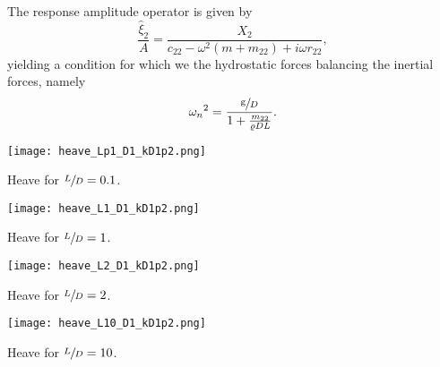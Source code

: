 The response amplitude operator is given by
\[
    \frac{\hat{\xi}_2}{A} = \frac{X_2}{c_{22} - \omega^2 (m + m_{22}) + i \omega r_{22}},
\]
yielding a condition for which we the hydrostatic forces balancing the inertial forces, namely
\[
    {\omega_n}^2 = \frac{\sfrac{\mathrm{g}}{D}}{1 + \frac{m_{22}}{\varrho D L}}.
\]
\begin{Figure}
    \centering
    \captionsetup{type = figure}
    \texttt{[image: heave\_Lp1\_D1\_kD1p2.png]}
    \caption{Heave for $\sfrac{L}{D} = 0.1$.}
\end{Figure}
\begin{Figure}
    \centering
    \captionsetup{type = figure}
    \texttt{[image: heave\_L1\_D1\_kD1p2.png]}
    \caption{Heave for $\sfrac{L}{D} = 1$.}
\end{Figure}
\begin{Figure}
    \centering
    \captionsetup{type = figure}
    \texttt{[image: heave\_L2\_D1\_kD1p2.png]}
    \caption{Heave for $\sfrac{L}{D} = 2$.}
\end{Figure}
\begin{Figure}
    \centering
    \captionsetup{type = figure}
    \texttt{[image: heave\_L10\_D1\_kD1p2.png]}
    \caption{Heave for $\sfrac{L}{D} = 10$.}
\end{Figure}